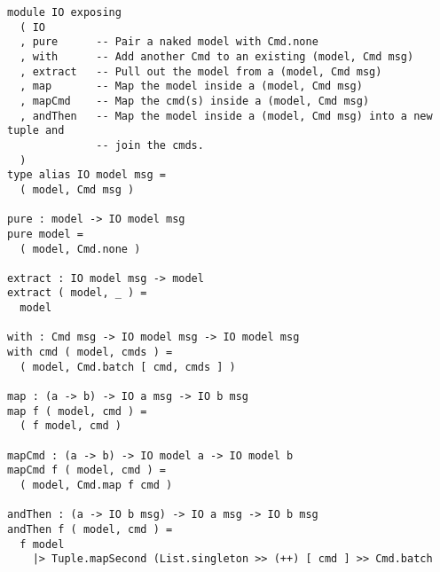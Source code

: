 




\begin{verbatim}
module IO exposing
  ( IO
  , pure      -- Pair a naked model with Cmd.none
  , with      -- Add another Cmd to an existing (model, Cmd msg)
  , extract   -- Pull out the model from a (model, Cmd msg)
  , map       -- Map the model inside a (model, Cmd msg)
  , mapCmd    -- Map the cmd(s) inside a (model, Cmd msg)
  , andThen   -- Map the model inside a (model, Cmd msg) into a new tuple and
              -- join the cmds.
  )
type alias IO model msg =
  ( model, Cmd msg )

pure : model -> IO model msg
pure model =
  ( model, Cmd.none )

extract : IO model msg -> model
extract ( model, _ ) =
  model

with : Cmd msg -> IO model msg -> IO model msg
with cmd ( model, cmds ) =
  ( model, Cmd.batch [ cmd, cmds ] )

map : (a -> b) -> IO a msg -> IO b msg
map f ( model, cmd ) =
  ( f model, cmd )

mapCmd : (a -> b) -> IO model a -> IO model b
mapCmd f ( model, cmd ) =
  ( model, Cmd.map f cmd )

andThen : (a -> IO b msg) -> IO a msg -> IO b msg
andThen f ( model, cmd ) =
  f model
    |> Tuple.mapSecond (List.singleton >> (++) [ cmd ] >> Cmd.batch

\end{verbatim}